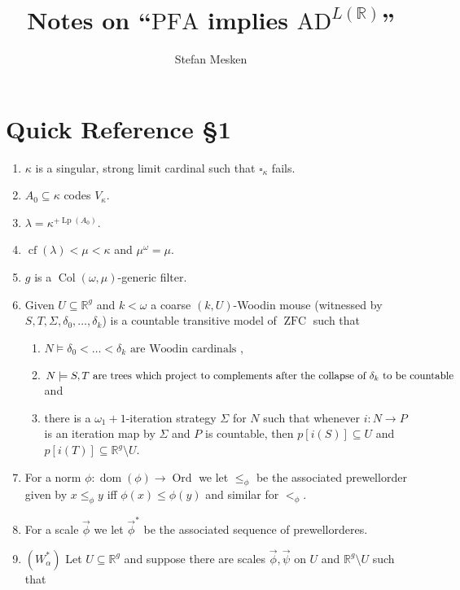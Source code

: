 \documentclass[12pt,a4paper]{article}
\theoremstyle{nicestyle}
\DeclareMathOperator{\Col}{Col}
\DeclareMathOperator{\dom}{dom}
\DeclareMathOperator{\ord}{Ord}
\DeclareMathOperator{\ZFC}{ZFC}
\DeclareMathOperator{\cf}{cf}
\DeclareMathOperator{\Lp}{Lp}
\begin{document}
\author{Stefan Mesken}
\title{Notes on ``$\mathrm{PFA}$ implies $\mathrm{AD}^{L(\mathbb{R})}$''}
\maketitle

\section{Quick Reference \S 1}
\begin{enumerate}
\item $\kappa$ is a singular, strong limit cardinal such that $\square_{\kappa}$ fails. 
\item $A_0 \subseteq \kappa$ codes $V_{\kappa}$.
\item $\lambda = \kappa^{+ \Lp(A_{0})}$.
\item $\cf(\lambda) < \mu < \kappa$ and $\mu^{\omega} = \mu$.
\item $g$ is a $\Col(\omega,\mu)$-generic filter.
\item Given $U \subseteq \mathbb{R}^g$ and $k < \omega$ a coarse
  $(k, U)$-Woodin mouse (witnessed by
  $S, T, \Sigma, \delta_0, \ldots, \delta_k$) is a countable
  transitive model of $\ZFC$ such that
  \begin{enumerate}
  \item
    $N \models \delta_0 < \ldots < \delta_k \text{ are Woodin
      cardinals}$ ,
  \item
    $N \models S,T \text{ are trees which project to complements after
      the collapse } \\ \text{of } \delta_k \text{ to be countable}$ and
  \item there is a $\omega_1+1$-iteration strategy $\Sigma$ for $N$
    such that whenever $i \colon N \to P$ is an iteration map by
    $\Sigma$ and $P$ is countable, then $p[i(S)] \subseteq U$ and
    $p[i(T)] \subseteq \mathbb{R}^g \setminus U$.
  \end{enumerate}
\item For a norm $\phi \colon \dom(\phi) \to \ord$ we let $\le_{\phi}$
  be the associated prewellorder given by $x \le_{\phi} y$ iff
  $\phi(x) \le \phi(y)$ and similar for $<_{\phi}$.
\item For a scale $\vec{\phi}$ we let $\vec{\phi}^{*}$ be the
  associated sequence of prewellorderes.
\item $(W_{\alpha}^{*})$ Let $U \subseteq \mathbb{R}^g$ and suppose
  there are scales $\vec{\phi}, \vec{\psi}$ on $U$ and
  $\mathbb{R}^g \setminus U$ such that

\end{enumerate}
\end{document}
